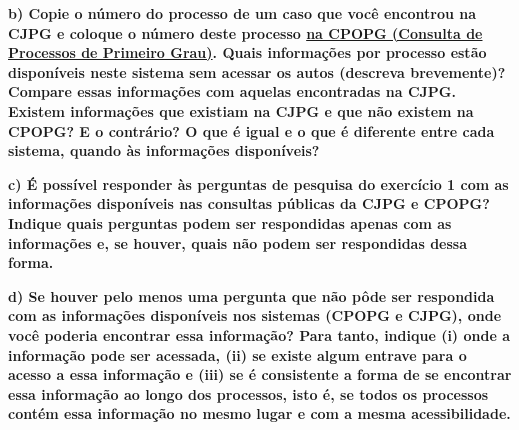 \documentclass[
  letterpaper,
  DIV=11,
  numbers=noendperiod]{scrartcl}
\begin{document}
\textbf{b) Copie o número do processo de um caso que você encontrou na
CJPG e coloque o número deste processo
\href{https://esaj.tjsp.jus.br/cpopg/open.do}{na CPOPG (Consulta de
Processos de Primeiro Grau)}. Quais informações por processo estão
disponíveis neste sistema sem acessar os autos (descreva brevemente)?
Compare essas informações com aquelas encontradas na CJPG. Existem
informações que existiam na CJPG e que não existem na CPOPG? E o
contrário? O que é igual e o que é diferente entre cada sistema, quando
às informações disponíveis?}

\textbf{c) É possível responder às perguntas de pesquisa do exercício 1
com as informações disponíveis nas consultas públicas da CJPG e CPOPG?
Indique quais perguntas podem ser respondidas apenas com as informações
e, se houver, quais não podem ser respondidas dessa forma.}

\textbf{d) Se houver pelo menos uma pergunta que não pôde ser respondida
com as informações disponíveis nos sistemas (CPOPG e CJPG), onde você
poderia encontrar essa informação? Para tanto, indique (i) onde a
informação pode ser acessada, (ii) se existe algum entrave para o acesso
a essa informação e (iii) se é consistente a forma de se encontrar essa
informação ao longo dos processos, isto é, se todos os processos contém
essa informação no mesmo lugar e com a mesma acessibilidade.}
\end{document}
